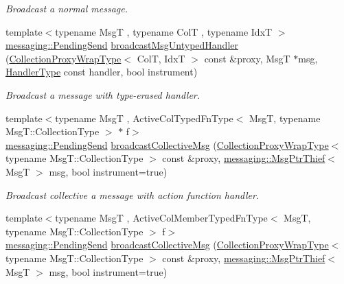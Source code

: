 \begin{DoxyCompactItemize}
\begin{DoxyCompactList}\small\item\em Broadcast a normal message. \end{DoxyCompactList}\item 
{\footnotesize template$<$typename MsgT , typename ColT , typename IdxT $>$ }\\\hyperlink{structvt_1_1messaging_1_1_pending_send}{messaging\+::\+Pending\+Send} \hyperlink{structvt_1_1vrt_1_1collection_1_1_collection_manager_a3a0ce58242fe4a9f18ca105ba9d9e8ea}{broadcast\+Msg\+Untyped\+Handler} (\hyperlink{structvt_1_1vrt_1_1collection_1_1_collection_manager_a56458ed7f9bb22b631b9b3a745f42f94}{Collection\+Proxy\+Wrap\+Type}$<$ ColT, IdxT $>$ const \&proxy, MsgT $\ast$msg, \hyperlink{namespacevt_af64846b57dfcaf104da3ef6967917573}{Handler\+Type} const handler, bool instrument)
\begin{DoxyCompactList}\small\item\em Broadcast a message with type-\/erased handler. \end{DoxyCompactList}\item 
{\footnotesize template$<$typename MsgT , Active\+Col\+Typed\+Fn\+Type$<$ Msg\+T, typename Msg\+T\+::\+Collection\+Type $>$ $\ast$ f$>$ }\\\hyperlink{structvt_1_1messaging_1_1_pending_send}{messaging\+::\+Pending\+Send} \hyperlink{structvt_1_1vrt_1_1collection_1_1_collection_manager_ae119b6f5097f722c4e965c9c1203943c}{broadcast\+Collective\+Msg} (\hyperlink{structvt_1_1vrt_1_1collection_1_1_collection_manager_a56458ed7f9bb22b631b9b3a745f42f94}{Collection\+Proxy\+Wrap\+Type}$<$ typename Msg\+T\+::\+Collection\+Type $>$ const \&proxy, \hyperlink{structvt_1_1messaging_1_1_msg_ptr_thief}{messaging\+::\+Msg\+Ptr\+Thief}$<$ MsgT $>$ msg, bool instrument=true)
\begin{DoxyCompactList}\small\item\em Broadcast collective a message with action function handler. \end{DoxyCompactList}\item 
{\footnotesize template$<$typename MsgT , Active\+Col\+Member\+Typed\+Fn\+Type$<$ Msg\+T, typename Msg\+T\+::\+Collection\+Type $>$ f$>$ }\\\hyperlink{structvt_1_1messaging_1_1_pending_send}{messaging\+::\+Pending\+Send} \hyperlink{structvt_1_1vrt_1_1collection_1_1_collection_manager_ae119b6f5097f722c4e965c9c1203943c}{broadcast\+Collective\+Msg} (\hyperlink{structvt_1_1vrt_1_1collection_1_1_collection_manager_a56458ed7f9bb22b631b9b3a745f42f94}{Collection\+Proxy\+Wrap\+Type}$<$ typename Msg\+T\+::\+Collection\+Type $>$ const \&proxy, \hyperlink{structvt_1_1messaging_1_1_msg_ptr_thief}{messaging\+::\+Msg\+Ptr\+Thief}$<$ MsgT $>$ msg, bool instrument=true)

\end{DoxyCompactItemize}
